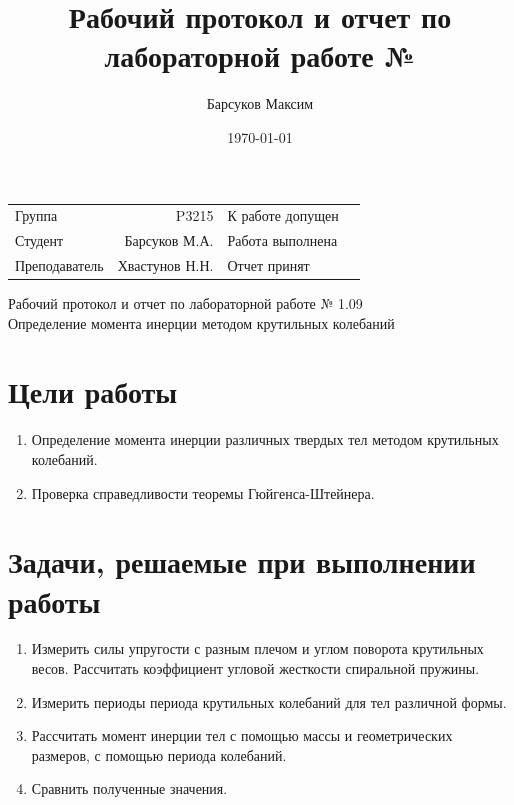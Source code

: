 \documentclass[a4paper,14pt]{article}
\author{Барсуков Максим}
\title{Рабочий протокол и отчет по лабораторной работе № \\}
\date{\today}
\begin{document}
	
\begin{table}[htbp]
	\centering
	\begin{tabular}{lrlr}
		Группа & \qquad \qquad P3215 & К работе допущен & \qquad \qquad \qquad \qquad \qquad \qquad \\
		\cmidrule{2-2}\cmidrule{4-4}         
		Студент &  \qquad \qquad Барсуков М.А.  & Работа выполнена & \qquad \qquad \qquad \qquad \qquad \qquad \\
		\cmidrule{2-2}\cmidrule{4-4}          
		Преподаватель & \qquad \qquad Хвастунов Н.Н. & Отчет принят & \qquad \qquad \qquad \qquad \qquad \qquad \\
		\cmidrule{2-2}\cmidrule{4-4}    
	\end{tabular}%
\end{table}%
	
\begin{center}
	\LARGE
	Рабочий протокол и отчет по лабораторной работе № 1.09 \\
	Определение момента инерции методом крутильных колебаний	
\end{center}


\section{Цели работы}

\begin{enumerate}
\item  Определение момента инерции различных твердых тел
методом крутильных колебаний.
\item Проверка справедливости теоремы Гюйгенса-Штейнера.
\end{enumerate}

\section{Задачи, решаемые при выполнении работы}

\begin{enumerate}
	\item Измерить силы упругости с разным плечом и углом поворота крутильных весов. Рассчитать коэффициент угловой жесткости спиральной пружины.
	\item Измерить периоды периода крутильных колебаний для тел различной формы.
	\item Рассчитать момент инерции тел с помощью массы и геометрических размеров, с помощью периода колебаний.
	\item Сравнить полученные значения.
\end{enumerate}
\end{document}
